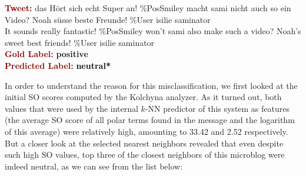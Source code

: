 \begin{example}\label{snt:cgsa:exmp:kolchyna-error-0}
  \noindent\textup{\bfseries\textcolor{darkred}{Tweet:}} {\upshape
    das H\"ort sich echt Super an! \%PosSmiley macht sami nicht auch so ein Video? Noah s\"usse beste Freunde! \heart \%User isilie saminator}\\
  \noindent It sounds really fantastic! \%PosSmiley won't sami also make such a video? Noah's sweet best friends! \heart \%User isilie saminator\\[0.65em]
  \noindent\textup{\bfseries\textcolor{darkred}{Gold Label:}}\hspace*{4.3em}\textbf{%
    \upshape\textcolor{green3}{positive}}\\
 \noindent\textup{\bfseries\textcolor{darkred}{Predicted Label:}}\hspace*{2em}\textbf{%
    \upshape\textcolor{black}{neutral*}}\\
\end{example}

\noindent In order to understand the reason for this
misclassification, we first looked at the initial SO scores computed
by the Kolchyna analyzer.  As it turned out, both values that were
used by the internal $k$-NN predictor of this system as features (the
average SO score of all polar terms found in the message and the
logarithm of this average) were relatively high, amounting to 33.42
and 2.52 respectively.  But a closer look at the selected nearest
neighbors revealed that even despite such high SO values, top three of
the closest neighbors of this microblog were indeed neutral, as we can
see from the list below:

